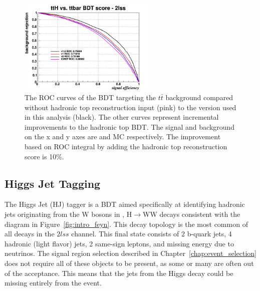 \begin{figure}[htb]
 \centering
   \includegraphics[width=0.6\textwidth]{ch9_figs/improvement_roc.png}
   \caption[ROC curves of $t\bar{t}$ BDT with and without hadronic top reconstruction input]{The ROC curves of the BDT targeting the $t\bar{t}$ background compared without 
   hadronic top reconstruction input (pink) to the version used in this analysis (black). The other curves represent incremental improvements to the hadronic top BDT. The signal
   and background on the x and y axes are \tth and \ttbar MC respectively. The improvement based on ROC integral by adding the hadronic top reconstruction score is 10$\%$.}
  \label{fig:hadtop_performance}
\end{figure}

\subsection{Higgs Jet Tagging}
The Higgs Jet (HJ) tagger is a BDT aimed specifically at identifying hadronic jets originating from the W bosons in \tth, H$\rightarrow$WW decays consistent
with the \tth diagram in Figure~\ref{fig:intro_feyn}. This decay topology is the most common of all \tth decays in the $2lss$ channel. This final state
consists of 2 b-quark jets, 4 hadronic (light flavor) jets, 2 same-sign leptons, and missing energy due to neutrinos. The signal region selection described
in Chapter~\ref{chap:event_selection} does not require all of these objects to be present, as some or many are often out of the acceptance. This means that
the jets from the Higgs decay could be missing entirely from the event.

